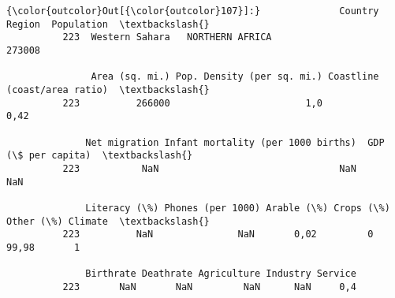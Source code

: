 \documentclass[11pt]{article}
\begin{document}
\begin{Verbatim}[commandchars=\\\{\}]
{\color{outcolor}Out[{\color{outcolor}107}]:}              Country                               Region  Population  \textbackslash{}
          223  Western Sahara   NORTHERN AFRICA                          273008   
          
               Area (sq. mi.) Pop. Density (per sq. mi.) Coastline (coast/area ratio)  \textbackslash{}
          223          266000                        1,0                         0,42   
          
              Net migration Infant mortality (per 1000 births)  GDP (\$ per capita)  \textbackslash{}
          223           NaN                                NaN                 NaN   
          
              Literacy (\%) Phones (per 1000) Arable (\%) Crops (\%) Other (\%) Climate  \textbackslash{}
          223          NaN               NaN       0,02         0     99,98       1   
          
              Birthrate Deathrate Agriculture Industry Service  
          223       NaN       NaN         NaN      NaN     0,4  
\end{Verbatim}
            

    
    
    
    
\end{document}
